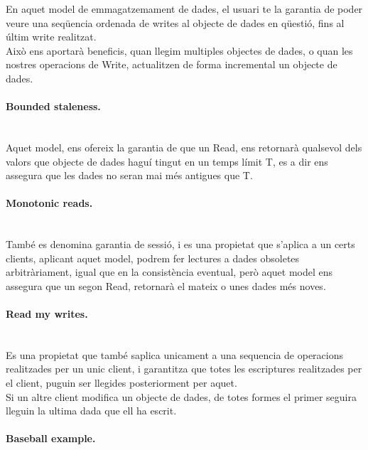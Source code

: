 \documentclass[a4paper, 10pt]{article}
\begin{document}
En aquet model de emmagatzemament de dades, el usuari te la garantia de poder veure una seqüencia ordenada de writes al objecte de dades en qüestió, fins al últim write realitzat.\\
Això ens aportarà beneficis, quan llegim multiples objectes de dades, o quan les nostres operacions de Write, actualitzen de forma incremental un objecte de dades.
\paragraph{Bounded staleness.\\\\}

Aquet model, ens ofereix la garantia de que un Read, ens retornarà qualsevol dels valors que objecte de dades haguí tingut en un temps límit T, es a dir ens assegura que les dades no seran mai més antigues que T.

\paragraph{Monotonic reads.\\\\}
També es denomina garantia de sessió, i es una propietat que s'aplica a un certs clients, aplicant aquet model, podrem fer lectures a dades obsoletes arbitràriament, igual que en la consistència eventual, però aquet model ens assegura que un segon Read, retornarà el mateix o unes dades més noves.

\paragraph{Read my writes.\\\\}


Es una propietat que també saplica unicament a una sequencia de operacions realitzades per un unic client, i garantitza que totes les escriptures realitzades per el client, puguin ser llegides posteriorment per aquet.\\
Si un altre client modifica un objecte de dades, de totes formes el primer seguira lleguin la ultima dada que ell ha escrit.

\paragraph{Baseball example.\\\\}
\end{document}
